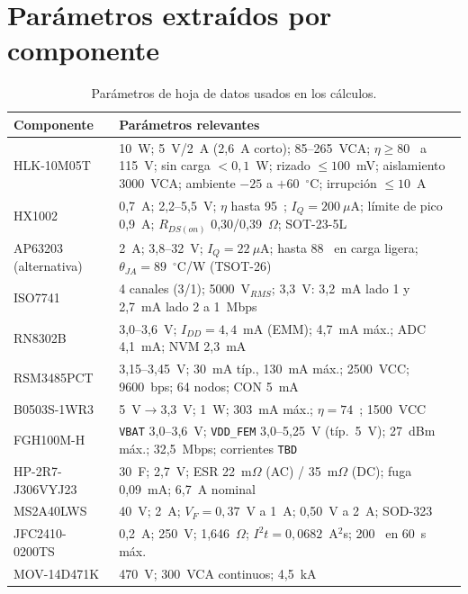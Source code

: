 \documentclass[11pt,a4paper]{article}
\newcommand{\pct}{\text{\char37}}
\begin{document}
\appendix
\section{Parámetros extraídos por componente}

\begin{table}[H]
\centering
\caption{Parámetros de hoja de datos usados en los cálculos.}
\label{tab:parametros}
\small
\begin{tabularx}{\textwidth}{@{}l X@{}}
\toprule
\textbf{Componente} & \textbf{Parámetros relevantes} \\
\midrule
HLK-10M05T & 10~W; 5~V/2~A (2,6~A corto); 85--265~VCA; $\eta \ge 80$~\pct{} a 115~V; sin carga $<0{,}1$~W; rizado $\le100$~mV; aislamiento 3000~VCA; ambiente $-25$ a $+60$~$^\circ$C; irrupción $\le10$~A \\
HX1002 & 0,7~A; 2,2--5,5~V; $\eta$ hasta 95~\pct; $I_Q=200~\mu$A; límite de pico 0,9~A; $R_{DS(on)}$ 0,30/0,39~$\Omega$; SOT-23-5L \\
AP63203 (alternativa) & 2~A; 3,8--32~V; $I_Q=22~\mu$A; hasta 88~\pct{} en carga ligera; $\theta_{JA}=89$~$^\circ$C/W (TSOT-26) \\
ISO7741 & 4 canales (3/1); 5000~V$_{RMS}$; 3,3~V: 3,2~mA lado 1 y 2,7~mA lado 2 a 1~Mbps \\
RN8302B & 3,0--3,6~V; $I_{DD}=4{,}4$~mA (EMM); 4,7~mA máx.; ADC 4,1~mA; NVM 2,3~mA \\
RSM3485PCT & 3,15--3,45~V; 30~mA típ., 130~mA máx.; 2500~VCC; 9600~bps; 64 nodos; CON 5~mA \\
B0503S-1WR3 & 5~V$\to$3,3~V; 1~W; 303~mA máx.; $\eta=74$~\pct; 1500~VCC \\

FGH100M-H & \texttt{VBAT} 3,0--3,6~V; \texttt{VDD\_FEM} 3,0--5,25~V (típ.\ 5~V); 27~dBm máx.; 32,5~Mbps; corrientes \texttt{TBD} \\
HP-2R7-J306VYJ23 & 30~F; 2,7~V; ESR 22~m$\Omega$ (AC) / 35~m$\Omega$ (DC); fuga 0,09~mA; 6,7~A nominal \\
MS2A40LWS & 40~V; 2~A; $V_F=0{,}37$~V a 1~A; 0,50~V a 2~A; SOD-323 \\
JFC2410-0200TS & 0,2~A; 250~V; 1,646~$\Omega$; $I^2t=0{,}0682$~A$^2$s; 200~\pct{} en 60~s máx. \\
MOV-14D471K & 470~V; 300~VCA continuos; 4,5~kA \\
\bottomrule
\end{tabularx}
\end{table}
\end{document}
